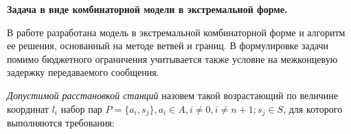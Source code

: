\textbf{Задача в виде комбинаторной модели в экстремальной форме.}



В работе разработана модель в экстремальной комбинаторной форме и алгоритм ее решения, основанный на методе ветвей и границ. В формулировке задачи помимо бюджетного ограничения учитывается также условие на межконцевую задержку передаваемого сообщения. 


\textit{Допустимой расстановкой станций} назовем такой возрастающий по величине координат $l_i$  набор пар $P = \{a_i, s_j\},a_i \in A,i \neq 0,i \neq n+1;s_j \in S$, для которого выполняются требования:

